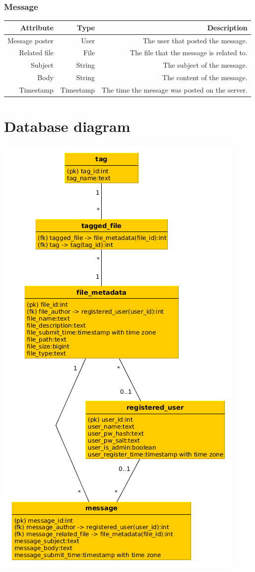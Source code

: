 \documentclass[10pt,a4paper]{article}
\begin{document}
\subsubsection{Message}
\begin{tabularx}{\textwidth}{|R|R|R|} \hline
\textbf{Attribute} & \textbf{Type} & \textbf{Description}\\ \hline
Message poster & User & The user that posted the message.\\ \hline
Related file & File & The file that the message is related to.\\ \hline
Subject & String & The subject of the message.\\ \hline
Body & String & The content of the message.\\ \hline
Timestamp & Timestamp & The time the message was posted on the server.\\ \hline
\end{tabularx}

\section{Database diagram}
\includegraphics[scale=0.7]{diagrams/database.png}
\end{document}
